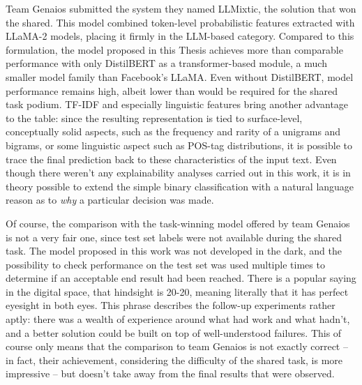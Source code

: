 Team Genaios \citep{sarvazyan-etal-2024-genaios} submitted the system they named LLMixtic, the solution that won the shared.
This model combined token-level probabilistic features extracted with LLaMA-2 models, placing it firmly in the LLM-based category.
Compared to this formulation, the model proposed in this Thesis achieves more than comparable performance with only DistilBERT as a transformer-based module, a much smaller model family than Facebook's LLaMA.
Even without DistilBERT, model performance remains high, albeit lower than would be required for the shared task podium.
TF-IDF and especially linguistic features bring another advantage to the table: since the resulting representation is tied to surface-level, conceptually solid aspects, such as the frequency and rarity of a unigrams and bigrams, or some linguistic aspect such as POS-tag distributions, it is possible to trace the final prediction back to these characteristics of the input text.
Even though there weren't any explainability analyses carried out in this work, it is in theory possible to extend the simple binary classification with a natural language reason as to \emph{why} a particular decision was made.

Of course, the comparison with the task-winning model offered by team Genaios is not a very fair one, since test set labels were not available during the shared task.
The model proposed in this work was not developed in the dark, and the possibility to check performance on the test set was used multiple times to determine if an acceptable end result had been reached.
There is a popular saying in the digital space, that hindsight is 20-20, meaning literally that it has perfect eyesight in both eyes.
This phrase describes the follow-up experiments rather aptly: there was a wealth of experience around what had work and what hadn't, and a better solution could be built on top of well-understood failures.
This of course only means that the comparison to team Genaios is not exactly correct -- in fact, their achievement, considering the difficulty of the shared task, is more impressive -- but doesn't take away from the final results that were observed.

